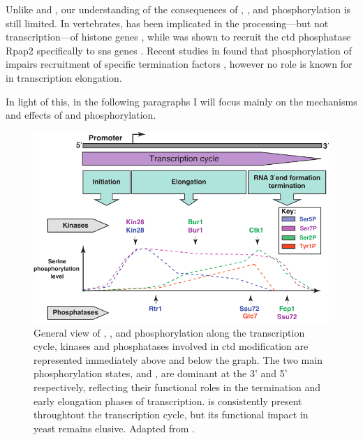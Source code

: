 Unlike \sert{} and \serf{}, our understanding of the consequences of \tyr{}, \thr{}, and \sers{} phosphorylation is still limited. 
In vertebrates, \thr{} has been implicated in the processing---but not transcription---of histone genes  \cite{hsin:2011:rnap}, while \sers{} was shown to recruit the \gls{ctd} phosphatase Rpap2 specifically to \gls{sns} genes \citep{egloff:2012:role}.
Recent studies in \cer{} found that phosphorylation of \tyr{} impairs recruitment of specific termination factors \cite{mayer:2012:ctd,schreieck:2014:rna} , however no role is known for \tyr{} in transcription elongation.  

In light of this, in the following paragraphs I will focus mainly on the mechanisms and effects of \sert{} and \serf{} phosphorylation.

\begin{figure}[ht]

\centering
\includegraphics[width=\textwidth]{figures/introduction/ctdPhospho}
\caption[CTD phosphorylation states throughout the transcription cycle.]{
General view of \sert{}, \serf{}, and \sers{} phosphorylation along the transcription cycle,
kinases and phosphatases involved in \gls{ctd} modification are represented immediately above and below the graph.
The two main phosphorylation states, \sert{} and \serf{}, are dominant at the 3' and 5' respectively, reflecting their functional roles in the termination and early elongation phases of transcription.
\sers{} is consistently present throughtout the transcription cycle, but its functional impact in yeast remains elusive. Adapted from \citep{egloff:2012:updating}.
}
\label{fig:ctdPhospho}

\end{figure}

